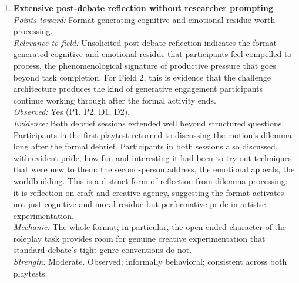 \begin{enumerate}
\item \textbf{Extensive post-debate reflection without researcher prompting}\\
\textit{Points toward:} Format generating cognitive and emotional residue worth processing.\\
\textit{Relevance to field:} Unsolicited post-debate reflection indicates the format generated cognitive and emotional residue that participants feel compelled to process, the phenomenological signature of productive pressure that goes beyond task completion. For Field 2, this is evidence that the challenge architecture produces the kind of generative engagement participants continue working through after the formal activity ends.\\
\textit{Observed:} Yes (P1, P2, D1, D2).\\
\textit{Evidence:} Both debrief sessions extended well beyond structured questions. Participants in the first playtest returned to discussing the motion's dilemma long after the formal debrief. Participants in both sessions also discussed, with evident pride, how fun and interesting it had been to try out techniques that were new to them: the second-person address, the emotional appeals, the worldbuilding. This is a distinct form of reflection from dilemma-processing: it is reflection on craft and creative agency, suggesting the format activates not just cognitive and moral residue but performative pride in artistic experimentation.\\
\textit{Mechanic:} The whole format; in particular, the open-ended character of the roleplay task provides room for genuine creative experimentation that standard debate's tight genre conventions do not.\\
\textit{Strength:} Moderate. Observed; informally behavioral; consistent across both playtests.


\end{enumerate}
